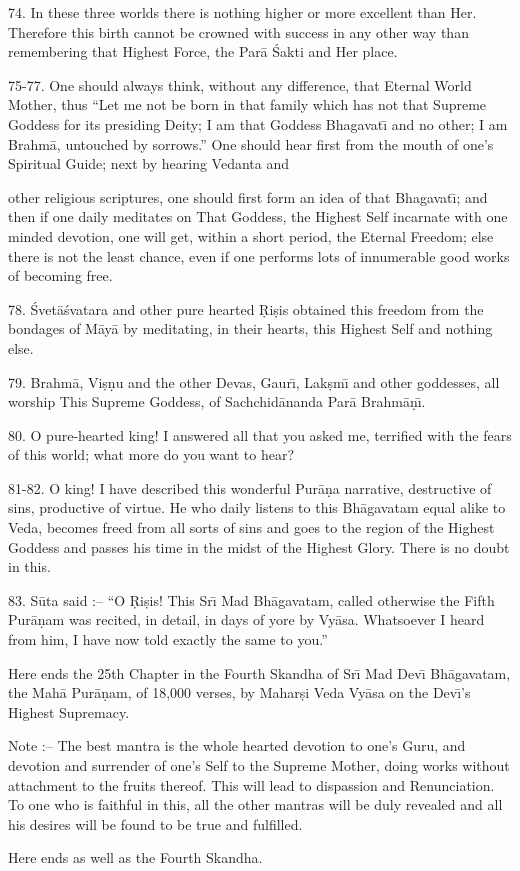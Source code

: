 74. In these three worlds there is nothing higher or more excellent than Her. Therefore this birth cannot be crowned with success in any other way than remembering that Highest Force, the Par\=a \'Sakti and Her place.

75-77. One should always think, without any difference, that Eternal World Mother, thus ``Let me not be born in that family which has not that Supreme Goddess for its presiding Deity; I am that Goddess Bhagavat\={\i} and no other; I am Brahm\=a, untouched by sorrows.'' One should hear first from the mouth of one's Spiritual Guide; next by hearing Vedanta and

other religious scriptures, one should first form an idea of that Bhagavat\={\i}; and then if one daily meditates on That Goddess, the Highest Self incarnate with one minded devotion, one will get, within a short period, the Eternal Freedom; else there is not the least chance, even if one performs lots of innumerable good works of becoming free.

78. \'Svet\=a\'svatara and other pure hearted \d{R}i\d{s}is obtained this freedom from the bondages of M\=ay\=a by meditating, in their hearts, this Highest Self and nothing else.

79. Brahm\=a, Vi\d{s}\d{n}u and the other Devas, Gaur\={\i}, Lak\d{s}m\={\i} and other goddesses, all worship This Supreme Goddess, of Sachchid\=ananda Par\=a Brahm\=a\d{n}\={\i}.

80. O pure-hearted king! I answered all that you asked me, terrified with the fears of this world; what more do you want to hear?

81-82. O king! I have described this wonderful Pur\=a\d{n}a narrative, destructive of sins, productive of virtue. He who daily listens to this Bh\=agavatam equal alike to Veda, becomes freed from all sorts of sins and goes to the region of the Highest Goddess and passes his time in the midst of the Highest Glory. There is no doubt in this.

83. S\=uta said :-- ``O \d{R}i\d{s}is! This Sr\={\i} Mad Bh\=agavatam, called otherwise the Fifth Pur\=a\d{n}am was recited, in detail, in days of yore by Vy\=asa. Whatsoever I heard from him, I have now told exactly the same to you.''

Here ends the 25th Chapter in the Fourth Skandha of Sr\={\i} Mad Dev\={\i} Bh\=agavatam, the Mah\=a Pur\=a\d{n}am, of 18,000 verses, by Mahar\d{s}i Veda Vy\=asa on the Dev\={\i}'s Highest Supremacy.

Note :-- The best mantra is the whole hearted devotion to one's Guru, and devotion and surrender of one's Self to the Supreme Mother, doing works without attachment to the fruits thereof. This will lead to dispassion and Renunciation. To one who is faithful in this, all the other mantras will be duly revealed and all his desires will be found to be true and fulfilled.

Here ends as well as the Fourth Skandha.



